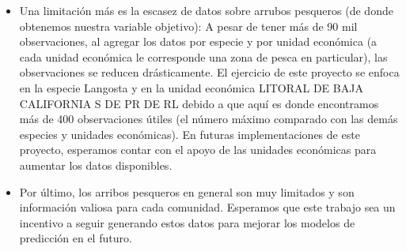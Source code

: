 \begin{enumerate}
\begin{itemize}
        \item Una limitación más es la escasez de datos sobre arrubos pesqueros (de donde obtenemos nuestra variable objetivo): A pesar de tener más de 90 mil observaciones, al agregar los datos por especie y por unidad económica (a cada unidad económica le corresponde una zona de pesca en particular), las observaciones se reducen drásticamente. El ejercicio de este proyecto se enfoca en la especie Langosta y en la unidad económica  LITORAL DE BAJA CALIFORNIA S DE PR DE RL debido a que aquí es donde encontramos más de 400 observaciones útiles (el número máximo comparado con las demás especies y unidades económicas). En futuras implementaciones de este proyecto, esperamos contar con el apoyo de las unidades económicas para aumentar los datos disponibles.
        
        \item Por último, los arribos pesqueros en general son muy limitados y son información valiosa para cada comunidad. Esperamos que este trabajo sea un incentivo a seguir generando estos datos para mejorar los modelos de predicción en el futuro.
    \end{itemize}
\end{enumerate}
